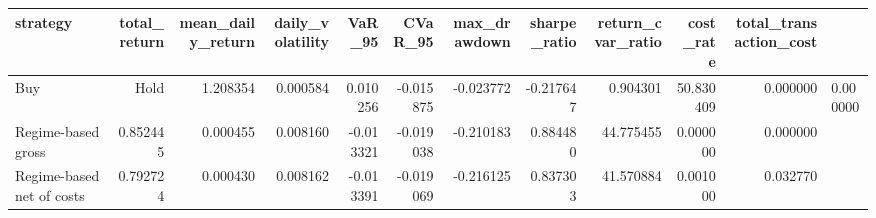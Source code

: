 \begin{tabular}{lrrrrrrrrrr}
\toprule
strategy & total_return & mean_daily_return & daily_volatility & VaR_95 & CVaR_95 & max_drawdown & sharpe_ratio & return_cvar_ratio & cost_rate & total_transaction_cost \\
\midrule
Buy & Hold & 1.208354 & 0.000584 & 0.010256 & -0.015875 & -0.023772 & -0.217647 & 0.904301 & 50.830409 & 0.000000 & 0.000000 \\
Regime-based gross & 0.852445 & 0.000455 & 0.008160 & -0.013321 & -0.019038 & -0.210183 & 0.884480 & 44.775455 & 0.000000 & 0.000000 \\
Regime-based net of costs & 0.792724 & 0.000430 & 0.008162 & -0.013391 & -0.019069 & -0.216125 & 0.837303 & 41.570884 & 0.001000 & 0.032770 \\
\bottomrule
\end{tabular}
